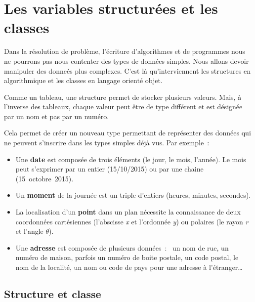 \chapter{Les variables structurées et les classes}
\label{structures-classes}

Dans la résolution de problème, l'écriture d'algorithmes et de programmes nous
ne pourrons pas nous contenter des types de données simples. Nous allons devoir
manipuler des donneés plus complexes. C'est là qu'interviennent les structures 
en algorithmique et les classes en langage orienté objet.

Comme un tableau, une structure permet de stocker plusieurs valeurs.  Mais,
à l’inverse des tableaux, chaque valeur peut être de type différent et est
désignée par un nom et pas par un numéro.
		
Cela permet de créer un nouveau type permettant de représenter des données qui
ne peuvent s’inscrire dans les types simples déjà vus.  Par exemple~:

\begin{itemize}

	\item Une \textbf{date} est composée de trois éléments (le jour, le mois,
		l’année). Le mois peut s’exprimer par un entier (15/10/2015) ou par une
		chaine (15~octobre~2015).
	
	\item Un \textbf{moment} de la journée est un triple d’entiers (heures,
		minutes, secondes).
		
	\item La localisation d’un \textbf{point} dans un plan nécessite la
		connaissance de deux coordonnées cartésiennes (l’abscisse \textit{x} et
		l’ordonnée \textit{y}) ou polaires (le rayon \textit{r} et l’angle
		\textit{$\theta$}).
	
	\item Une \textbf{adresse} est composée de plusieurs données~:~ un nom de
		rue, un numéro de maison, parfois un numéro de boite postale, un code
		postal, le nom de la localité, un nom ou code de pays pour une adresse
		à l’étranger\dots
	
\end{itemize}
	
\minitoc

\section{Structure et classe}

